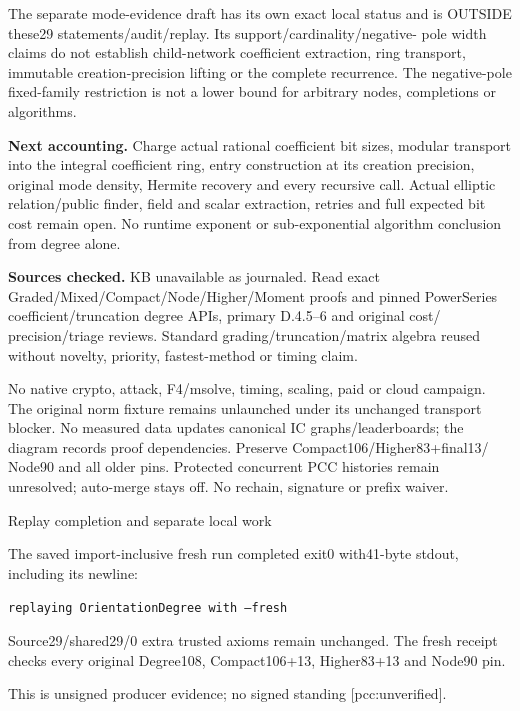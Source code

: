\documentclass[10pt]{article}
\begin{document}
The separate mode-evidence draft has its own exact local status and is
OUTSIDE these29 statements/audit/replay. Its support/cardinality/negative-
pole width claims do not establish child-network coefficient extraction,
ring transport, immutable creation-precision lifting or the complete
recurrence. The negative-pole fixed-family restriction is not a lower bound
for arbitrary nodes, completions or algorithms.

\textbf{Next accounting.} Charge actual rational coefficient bit sizes,
modular transport into the integral coefficient ring, entry construction at
its creation precision, original mode density, Hermite recovery and every
recursive call. Actual elliptic relation/public finder, field and scalar
extraction, retries and full expected bit cost remain open. No runtime
exponent or sub-exponential algorithm conclusion from degree alone.

\textbf{Sources checked.} KB unavailable as journaled. Read exact
Graded/Mixed/Compact/Node/Higher/Moment proofs and pinned PowerSeries
coefficient/truncation degree APIs, primary D.4.5--6 and original cost/
precision/triage reviews. Standard grading/truncation/matrix algebra reused
without novelty, priority, fastest-method or timing claim.

No native crypto, attack, F4/msolve, timing, scaling, paid or cloud campaign.
The original norm fixture remains unlaunched under its unchanged transport
blocker. No measured data updates canonical IC graphs/leaderboards; the
diagram records proof dependencies. Preserve Compact106/Higher83+final13/
Node90 and all older pins. Protected concurrent PCC histories remain
unresolved; auto-merge stays off. No rechain, signature or prefix waiver.
\newpage
\begin{center}{\Large Replay completion and separate local work}\end{center}
The saved import-inclusive fresh run completed exit0 with41-byte stdout,
including its newline:
\begin{center}\texttt{replaying OrientationDegree with --fresh}\end{center}
Source29/shared29/0 extra trusted axioms remain unchanged. The fresh receipt
checks every original Degree108, Compact106+13, Higher83+13 and Node90 pin.

This is unsigned producer evidence; no signed standing [pcc:unverified].
\begin{center}\small
{}\\
\end{center}
\end{document}
